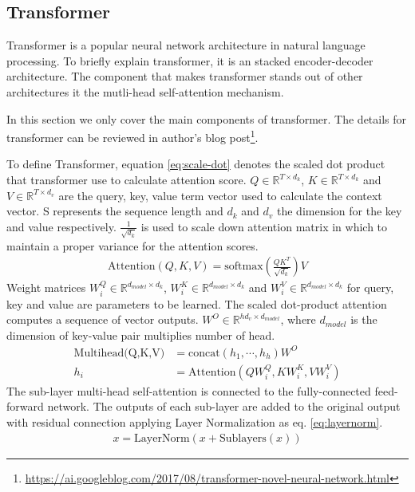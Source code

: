 \subsection{Transformer} \label{ch2:transformer}
Transformer\cite{vaswani_attention_nodate} is a popular neural network architecture in natural language processing. To briefly explain transformer, it is an stacked encoder-decoder architecture. The component that makes transformer stands out of other architectures it the mutli-head self-attention mechanism. 

In this section we only cover the main components of transformer. The details for transformer can be reviewed in author's blog post\footnote{\url{https://ai.googleblog.com/2017/08/transformer-novel-neural-network.html}}.

To define Transformer, equation \ref{eq:scale-dot} denotes the scaled dot product that transformer use to calculate attention score. $ Q\in\mathbb{R}^{T\times d_k} $,  $ K\in\mathbb{R}^{T\times d_k} $ and $ V\in\mathbb{R}^{T\times d_v} $ are the query, key, value term vector used to calculate the context vector. S represents the sequence length and $ d_k $ and $ d_v $ the dimension for the key and value respectively. $ \frac{1}{\sqrt{d_k}} $ is used to scale down attention matrix in which to maintain a proper variance for the attention scores.
\begin{align}\label{eq:scale-dot}
\text{Attention}(Q,K,V) = \text{softmax}\left(\frac{QK^T}{\sqrt{d_k}}\right)V
\end{align}
Weight matrices $ W_i^Q\in\mathbb{R}^{d_{model}\times d_k} $, $ W_i^K\in\mathbb{R}^{d_{model}\times d_k} $ and $ W_	i^V\in\mathbb{R}^{d_{model}\times d_k} $  for query, key and value are parameters to be learned. The scaled dot-product attention computes a sequence of vector outputs. $ W^O\in\mathbb{R}^{hd_v\times d_{model}} $, where $ d_{model} $ is the dimension of key-value pair multiplies number of head.
\begin{align}
\text{Multihead(Q,K,V)}&=\text{concat}(h_1,\cdots,h_h)W^O\\
h_i&=\text{Attention}(QW_i^Q,KW_i^K,VW_i^V)
\end{align}
The sub-layer multi-head self-attention is connected to the fully-connected feed-forward network. The outputs of each sub-layer are added to the original output with residual connection applying Layer Normalization as eq. \ref{eq:layernorm}.
\begin{align}\label{eq:layernorm}
x=\text{LayerNorm}(x+\text{Sublayers}(x))
\end{align}
